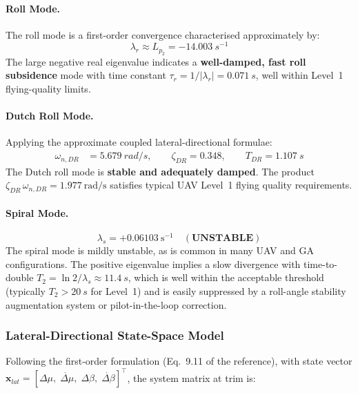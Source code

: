 \paragraph{Roll Mode.}
The roll mode is a first-order convergence characterised approximately by:
\begin{equation}
  \lambda_r \approx L_{p_2} = \SI{-14.003}{s^{-1}}
\end{equation}
The large negative real eigenvalue indicates a \textbf{well-damped, fast roll subsidence} mode with time constant $\tau_r = 1/|\lambda_r| = \SI{0.071}{s}$, well within Level~1 flying-quality limits.

\paragraph{Dutch Roll Mode.}
Applying the approximate coupled lateral-directional formulae:
\begin{align}
  \omega_{n,DR} &= \SI{5.679}{rad/s}, \qquad \zeta_{DR} = 0.348, \qquad T_{DR} = \SI{1.107}{s}
\end{align}
The Dutch roll mode is \textbf{stable and adequately damped}. The product $\zeta_{DR}\,\omega_{n,DR} = 1.977~\text{rad/s}$ satisfies typical UAV Level~1 flying quality requirements.

\paragraph{Spiral Mode.}
\begin{equation}
  \lambda_s = +0.06103~\text{s}^{-1} \quad (\textbf{UNSTABLE})
\end{equation}
The spiral mode is mildly unstable, as is common in many UAV and GA configurations. The positive eigenvalue implies a slow divergence with time-to-double $T_2 = \ln 2 / \lambda_s \approx \SI{11.4}{s}$, which is well within the acceptable threshold (typically $T_2 > \SI{20}{s}$ for Level~1) and is easily suppressed by a roll-angle stability augmentation system or pilot-in-the-loop correction.

\subsubsection{Lateral-Directional State-Space Model}

Following the first-order formulation (Eq.~9.11 of the reference), with state vector $\mathbf{x}_{lat} = [\Delta\mu,\; \dot{\Delta\mu},\; \Delta\beta,\; \dot{\Delta\beta}]^\top$, the system matrix at trim is:

